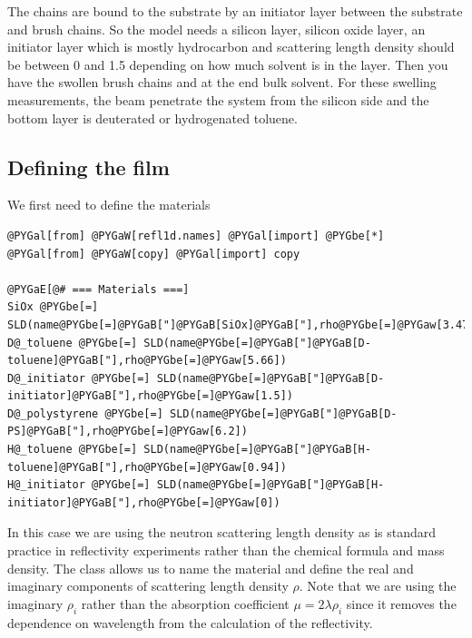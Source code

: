 \documentclass[letterpaper,10pt,english]{sphinxmanual}
\begin{document}
The chains are bound to the substrate by an initiator layer between the
substrate and brush chains. So the model needs a silicon layer, silicon
oxide layer, an initiator layer which is mostly hydrocarbon and
scattering length density should be between 0 and 1.5 depending on how
much solvent is in the layer. Then you have the swollen brush chains and
at the end bulk solvent. For these swelling measurements, the beam
penetrate the system from the silicon side and the bottom layer is
deuterated or hydrogenated toluene.


\subsection{Defining the film}
\label{examples/polymer/tethered:defining-the-film}\label{examples/polymer/tethered::doc}
We first need to define the materials

\begin{Verbatim}[commandchars=@\[\]]
@PYGal[from] @PYGaW[refl1d.names] @PYGal[import] @PYGbe[*]
@PYGal[from] @PYGaW[copy] @PYGal[import] copy

@PYGaE[@# === Materials ===]
SiOx @PYGbe[=] SLD(name@PYGbe[=]@PYGaB["]@PYGaB[SiOx]@PYGaB["],rho@PYGbe[=]@PYGaw[3.47])
D@_toluene @PYGbe[=] SLD(name@PYGbe[=]@PYGaB["]@PYGaB[D-toluene]@PYGaB["],rho@PYGbe[=]@PYGaw[5.66])
D@_initiator @PYGbe[=] SLD(name@PYGbe[=]@PYGaB["]@PYGaB[D-initiator]@PYGaB["],rho@PYGbe[=]@PYGaw[1.5])
D@_polystyrene @PYGbe[=] SLD(name@PYGbe[=]@PYGaB["]@PYGaB[D-PS]@PYGaB["],rho@PYGbe[=]@PYGaw[6.2])
H@_toluene @PYGbe[=] SLD(name@PYGbe[=]@PYGaB["]@PYGaB[H-toluene]@PYGaB["],rho@PYGbe[=]@PYGaw[0.94])
H@_initiator @PYGbe[=] SLD(name@PYGbe[=]@PYGaB["]@PYGaB[H-initiator]@PYGaB["],rho@PYGbe[=]@PYGaw[0])
\end{Verbatim}

In this case we are using the neutron scattering length density as is
standard practice in reflectivity experiments rather than the chemical
formula and mass density.  The {\hyperref[api/material:refl1d.material.SLD]{}} class
allows us to name the material and define the real and imaginary components
of scattering length density $\rho$.  Note that we are using the imaginary
$\rho_i$ rather than the absorption coefficient $\mu = 2\lambda\rho_i$
since it removes the dependence on wavelength from the calculation of
the reflectivity.
\end{document}
